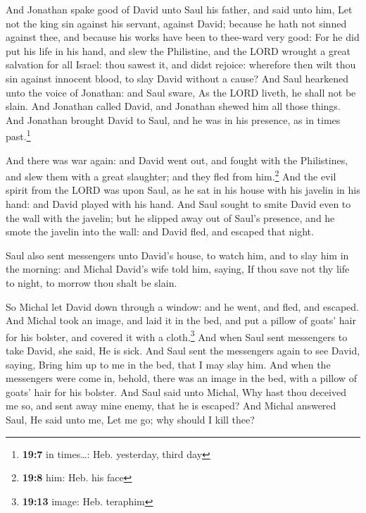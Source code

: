  And Jonathan spake good of David unto Saul his father,
and said unto him, Let not the king sin against his servant, against
David; because he hath not sinned against thee, and because his works
have been to thee-ward very good:  For he did put his life
in his hand, and slew the Philistine, and the LORD wrought a great
salvation for all Israel: thou sawest it, and didst rejoice: wherefore
then wilt thou sin against innocent blood, to slay David without a
cause?  And Saul hearkened unto the voice of Jonathan: and
Saul sware, As the LORD liveth, he shall not be slain. 
And Jonathan called David, and Jonathan shewed him all those things. And
Jonathan brought David to Saul, and he was in his presence, as in times
past.\footnote{\textbf{19:7} in times\ldots: Heb. yesterday, third day}

 And there was war again: and David went out, and fought
with the Philistines, and slew them with a great slaughter; and they
fled from him.\footnote{\textbf{19:8} him: Heb. his face} 
And the evil spirit from the LORD was upon Saul, as he sat in his house
with his javelin in his hand: and David played with his hand.
 And Saul sought to smite David even to the wall with the
javelin; but he slipped away out of Saul's presence, and he smote the
javelin into the wall: and David fled, and escaped that night.

 Saul also sent messengers unto David's house, to watch
him, and to slay him in the morning: and Michal David's wife told him,
saying, If thou save not thy life to night, to morrow thou shalt be
slain.

 So Michal let David down through a window: and he went,
and fled, and escaped.  And Michal took an image, and
laid it in the bed, and put a pillow of goats' hair for his bolster, and
covered it with a cloth.\footnote{\textbf{19:13} image: Heb. teraphim}
 And when Saul sent messengers to take David, she said,
He is sick.  And Saul sent the messengers again to see
David, saying, Bring him up to me in the bed, that I may slay him.
 And when the messengers were come in, behold, there was
an image in the bed, with a pillow of goats' hair for his bolster.
 And Saul said unto Michal, Why hast thou deceived me so,
and sent away mine enemy, that he is escaped? And Michal answered Saul,
He said unto me, Let me go; why should I kill thee?

